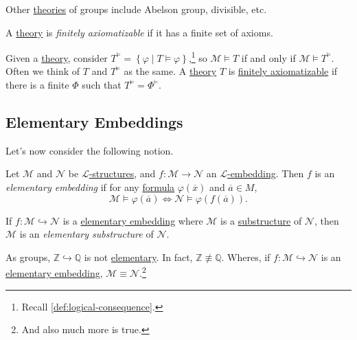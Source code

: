 Other \hyperref[def:theory]{theories} of groups include Abelson group, divisible, etc.

\begin{definition}\label{def:finitely-axiomatizable}
	A \hyperref[def:theory]{theory} is \emph{finitely axiomatizable} if it has a finite set of axioms.
\end{definition}

Given a \hyperref[def:theory]{theory}, consider \(T^{\models } = \left\{ \varphi \mid T \models \varphi \right\}\),\footnote{Recall \autoref{def:logical-consequence}.} so \(\mathcal{M} \models T\) if and only if \(\mathcal{M} \models T^{\models }\). Often we think of \(T\) and \(T^{\models }\) as the same. A \hyperref[def:theory]{theory} \(T\) is \hyperref[def:finitely-axiomatizable]{finitely axiomatizable} if there is a finite \(\Phi \) such that \(T^{\models } = \Phi ^{\models }\).

\subsection{Elementary Embeddings}
Let's now consider the following notion.

\begin{definition}\label{def:elementary-embedding}
	Let \(\mathcal{M} \) and \(\mathcal{N} \) be \hyperref[def:structure]{\(\mathcal{L} \)-structures}, and \(f\colon \mathcal{M} \to \mathcal{N} \) an \hyperref[def:embedding]{\(\mathcal{L} \)-embedding}. Then \(f\) is an \emph{elementary embedding} if for any \hyperref[def:formula]{formula} \(\varphi (\overline{x} )\) and \(\overline{a} \in M\),
	\[
		\mathcal{M} \models \varphi (\overline{a} )\iff \mathcal{N} \models \varphi (f(\overline{a} )).
	\]
\end{definition}

\begin{definition}\label{def:elementary-substructure}
	If \(f\colon \mathcal{M} \hookrightarrow \mathcal{N} \) is a \hyperref[def:elementary-embedding]{elementary embedding} where \(\mathcal{M}\) is a \hyperref[def:substructure]{substructure} of \(\mathcal{N} \), then \(\mathcal{M} \) is an \emph{elementary substructure} of \(\mathcal{N} \).
\end{definition}

\begin{eg}
	As groups, \(\mathbb{Z} \hookrightarrow \mathbb{Q} \) is not \hyperref[def:elementary-embedding]{elementary}. In fact, \(\mathbb{Z} \not\equiv \mathbb{Q} \). Wheres, if \(f\colon \mathcal{M} \hookrightarrow \mathcal{N} \) is an \hyperref[def:elementary-embedding]{elementary embedding}, \(\mathcal{M} \equiv \mathcal{N} \).\footnote{And also much more is true.}
\end{eg}


